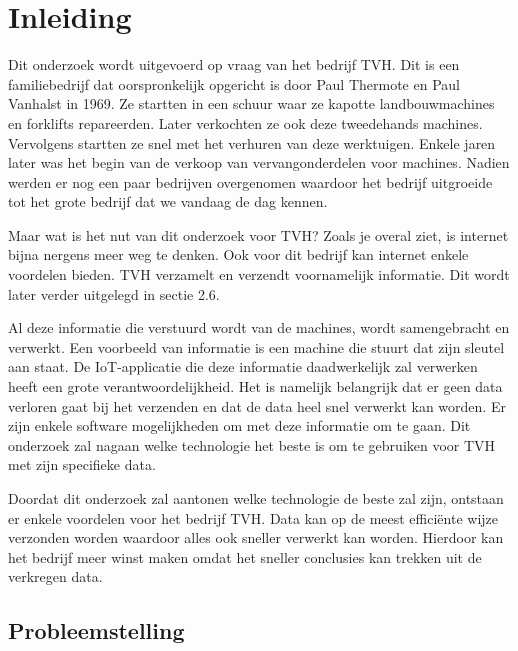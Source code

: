 
\chapter{Inleiding}
\label{ch:inleiding}

Dit onderzoek wordt uitgevoerd op vraag van het bedrijf TVH. Dit is een familiebedrijf dat oorspronkelijk opgericht is door Paul Thermote en Paul Vanhalst in 1969. Ze startten in een schuur waar ze kapotte landbouwmachines en forklifts repareerden. Later verkochten ze ook deze tweedehands machines. Vervolgens startten ze snel met het verhuren van deze werktuigen. Enkele jaren later was het begin van de verkoop van vervangonderdelen voor machines. Nadien werden er nog een paar bedrijven overgenomen waardoor het bedrijf uitgroeide tot het grote bedrijf dat we vandaag de dag kennen. 

Maar wat is het nut van dit onderzoek voor TVH? Zoals je overal ziet, is internet bijna nergens meer weg te denken. Ook voor dit bedrijf kan internet enkele voordelen bieden. TVH verzamelt en verzendt voornamelijk informatie. Dit wordt later verder uitgelegd in sectie 2.6.

Al deze informatie die verstuurd wordt van de machines, wordt samengebracht en verwerkt. Een voorbeeld van informatie is een machine die stuurt dat zijn sleutel aan staat. De IoT-applicatie die deze informatie daadwerkelijk zal verwerken heeft een grote verantwoordelijkheid. Het is namelijk belangrijk dat er geen data verloren gaat bij het verzenden en dat de data heel snel verwerkt kan worden. Er zijn enkele software mogelijkheden om met deze informatie om te gaan. Dit onderzoek zal nagaan welke technologie het beste is om te gebruiken voor TVH met zijn specifieke data.

Doordat dit onderzoek zal aantonen welke technologie de beste zal zijn, ontstaan er enkele voordelen voor het bedrijf TVH. Data kan op de meest efficiënte wijze verzonden worden waardoor alles ook sneller verwerkt kan worden. Hierdoor kan het bedrijf meer winst maken omdat het sneller conclusies kan trekken uit de verkregen data. 




\section{Probleemstelling}
\label{sec:probleemstelling}

